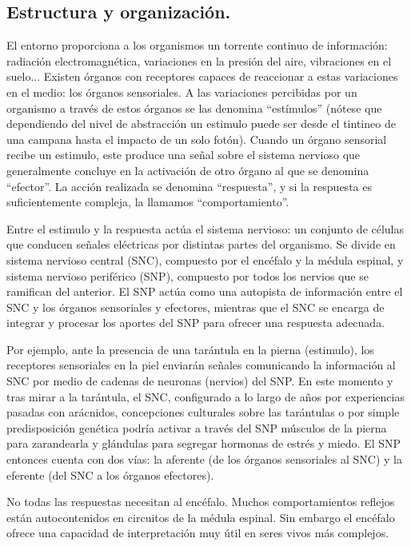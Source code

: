 \subsection{Estructura y organización.}

El entorno proporciona a los organismos un torrente continuo de información: radiación electromagnética, variaciones en la presión del aire, vibraciones en el suelo... Existen órganos con receptores capaces de reaccionar a estas variaciones en el medio: los órganos sensoriales. A las variaciones percibidas por un organismo a través de estos órganos se las denomina \enquote{estímulos} (nótese que dependiendo del nivel de abstracción un estimulo puede ser desde el tintineo de una campana hasta el impacto de un solo fotón). Cuando un órgano sensorial recibe un estimulo, este produce una señal sobre el sistema nervioso que generalmente concluye en la activación de otro órgano al que se denomina \enquote{efector}. La acción realizada se denomina \enquote{respuesta}, y si la respuesta es suficientemente compleja, la llamamos \enquote{comportamiento}.

Entre el estimulo y la respuesta actúa el sistema nervioso: un conjunto de células que conducen señales eléctricas por distintas partes del organismo. Se divide en sistema nervioso central (SNC), compuesto por el encéfalo y la médula espinal, y sistema nervioso periférico (SNP), compuesto por todos los nervios que se ramifican del anterior. El SNP actúa como una autopista de información entre el SNC y los órganos sensoriales y efectores, mientras que el SNC se encarga de integrar y procesar los aportes del SNP para ofrecer una respuesta adecuada.

Por ejemplo, ante la presencia de una tarántula en la pierna (estimulo), los receptores sensoriales en la piel enviarán señales comunicando la información al SNC por medio de cadenas de neuronas (nervios) del SNP. En este momento y tras mirar a la tarántula, el SNC, configurado a lo largo de años por experiencias pasadas con arácnidos, concepciones culturales sobre las tarántulas o por simple predisposición genética podría activar a través del SNP músculos de la pierna para zarandearla y glándulas para segregar hormonas de estrés y miedo. El SNP entonces cuenta con dos vías: la aferente (de los órganos sensoriales al SNC) y la eferente (del SNC a los órganos efectores).

No todas las respuestas necesitan al encéfalo. Muchos comportamientos reflejos están autocontenidos en circuitos de la médula espinal. Sin embargo el encéfalo ofrece una capacidad de interpretación muy útil en seres vivos más complejos.

